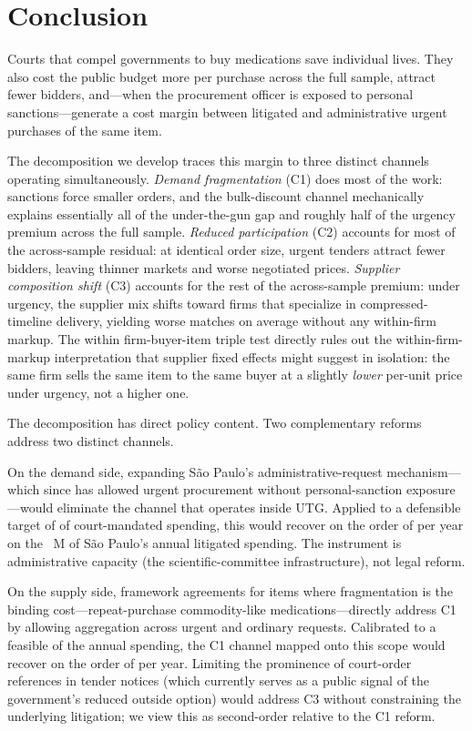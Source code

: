 \section{Conclusion}
\label{sec:conclusion}

Courts that compel governments to buy medications save individual lives. They also cost the public budget \BPnegPctHeadline{} more per purchase across the full sample, attract \BPfirmsPctHeadline{} fewer bidders, and---when the procurement officer is exposed to personal sanctions---generate a \BPutgPctRange{} cost margin between litigated and administrative urgent purchases of the same item.

The decomposition we develop traces this margin to three distinct channels operating simultaneously. \emph{Demand fragmentation} (C1) does most of the work: sanctions force smaller orders, and the bulk-discount channel mechanically explains essentially all of the under-the-gun gap and roughly half of the urgency premium across the full sample. \emph{Reduced participation} (C2) accounts for most of the across-sample residual: at identical order size, urgent tenders attract \BPfirmsPanelBpct{} fewer bidders, leaving thinner markets and worse negotiated prices. \emph{Supplier composition shift} (C3) accounts for the rest of the across-sample premium: under urgency, the supplier mix shifts toward firms that specialize in compressed-timeline delivery, yielding worse matches on average without any within-firm markup. The within firm-buyer-item triple test directly rules out the within-firm-markup interpretation that supplier fixed effects might suggest in isolation: the same firm sells the same item to the same buyer at a slightly \emph{lower} per-unit price under urgency, not a higher one.

The decomposition has direct policy content. Two complementary reforms address two distinct channels.

On the demand side, expanding S\~ao Paulo's administrative-request mechanism---which since \BPsampleStartYear{} has allowed urgent procurement without personal-sanction exposure---would eliminate the channel that operates inside UTG. Applied to a defensible target of \BPpolicyAdminEligibleShare{} of court-mandated spending, this would recover on the order of \BPpolicyAdminRecoveryHigh{} per year on the \BPlitSpendingUSDmm~M of S\~ao Paulo's annual litigated spending. The instrument is administrative capacity (the scientific-committee infrastructure), not legal reform.

On the supply side, framework agreements for items where fragmentation is the binding cost---repeat-purchase commodity-like medications---directly address C1 by allowing aggregation across urgent and ordinary requests. Calibrated to a feasible \BPpolicyFrameworkFeasibleShare{} of the annual spending, the C1 channel mapped onto this scope would recover on the order of \BPpolicyFrameworkRecovery{} per year. Limiting the prominence of court-order references in tender notices (which currently serves as a public signal of the government's reduced outside option) would address C3 without constraining the underlying litigation; we view this as second-order relative to the C1 reform.

